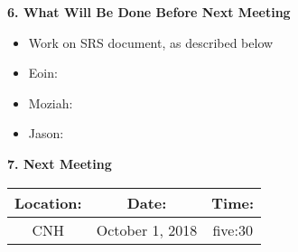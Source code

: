 \documentclass[12pt]{article}
\begin{document}
\begin{flushleft}
\textbf{6. What Will Be Done Before Next Meeting}\\
\begin{itemize}
\item Work on SRS document, as described below\\
\item Eoin:
\item Moziah:
\item Jason:
\end{itemize}

\textbf{7. Next Meeting}\\
\begin{center}
 \begin{tabular}{|c | c | c |}
\hline
 Location: & Date: & Time: \\
 \hline
 CNH & October 1, 2018 & five:30\\
\hline
\end{tabular}
\end{center}

\end{flushleft}
\end{document}
